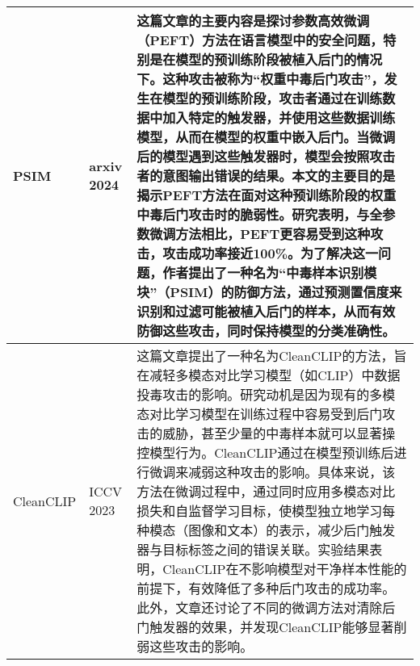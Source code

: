 \documentclass[lettersize,journal]{IEEEtran}
\begin{document}
\begin{longtable}{|p{3.5cm}|p{2cm}|p{10.5cm}|}
    PSIM\cite{zhao2024defending} & arxiv 2024 & 这篇文章的主要内容是探讨参数高效微调（PEFT）方法在语言模型中的安全问题，特别是在模型的预训练阶段被植入后门的情况下。这种攻击被称为“权重中毒后门攻击”，发生在模型的预训练阶段，攻击者通过在训练数据中加入特定的触发器，并使用这些数据训练模型，从而在模型的权重中嵌入后门。当微调后的模型遇到这些触发器时，模型会按照攻击者的意图输出错误的结果。本文的主要目的是揭示PEFT方法在面对这种预训练阶段的权重中毒后门攻击时的脆弱性。研究表明，与全参数微调方法相比，PEFT更容易受到这种攻击，攻击成功率接近100\%。为了解决这一问题，作者提出了一种名为“中毒样本识别模块”（PSIM）的防御方法，通过预测置信度来识别和过滤可能被植入后门的样本，从而有效防御这些攻击，同时保持模型的分类准确性。 \\ \hline
    
    CleanCLIP\cite{bansal2023cleanclip} & ICCV 2023 & 这篇文章提出了一种名为CleanCLIP的方法，旨在减轻多模态对比学习模型（如CLIP）中数据投毒攻击的影响。研究动机是因为现有的多模态对比学习模型在训练过程中容易受到后门攻击的威胁，甚至少量的中毒样本就可以显著操控模型行为。CleanCLIP通过在模型预训练后进行微调来减弱这种攻击的影响。具体来说，该方法在微调过程中，通过同时应用多模态对比损失和自监督学习目标，使模型独立地学习每种模态（图像和文本）的表示，减少后门触发器与目标标签之间的错误关联。实验结果表明，CleanCLIP在不影响模型对干净样本性能的前提下，有效降低了多种后门攻击的成功率。此外，文章还讨论了不同的微调方法对清除后门触发器的效果，并发现CleanCLIP能够显著削弱这些攻击的影响。 \\ \hline


\end{longtable}
\end{document}
